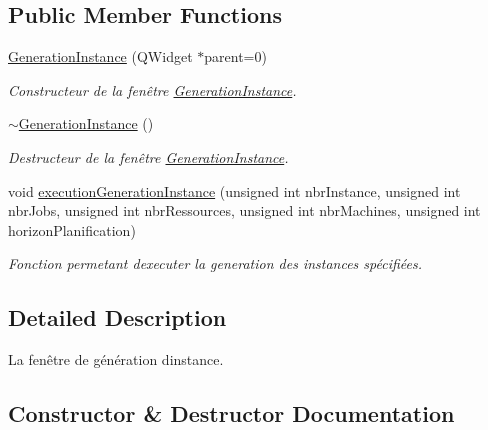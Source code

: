 \subsection*{Public Member Functions}
\begin{DoxyCompactItemize}
\item 
\hyperlink{classGenerationInstance_ac9c4a1ba1fe2f86209f116693f7c7b5b}{Generation\+Instance} (Q\+Widget $\ast$parent=0)
\begin{DoxyCompactList}\small\item\em Constructeur de la fenêtre \hyperlink{classGenerationInstance}{Generation\+Instance}. \end{DoxyCompactList}\item 
\hyperlink{classGenerationInstance_a14cdea0af4a47deb38a3a5fa59bb6d40}{$\sim$\+Generation\+Instance} ()
\begin{DoxyCompactList}\small\item\em Destructeur de la fenêtre \hyperlink{classGenerationInstance}{Generation\+Instance}. \end{DoxyCompactList}\item 
void \hyperlink{classGenerationInstance_a132cf0624c95e2891bf5662198ca42cf}{execution\+Generation\+Instance} (unsigned int nbr\+Instance, unsigned int nbr\+Jobs, unsigned int nbr\+Ressources, unsigned int nbr\+Machines, unsigned int horizon\+Planification)
\begin{DoxyCompactList}\small\item\em Fonction permetant d\textquotesingle{}executer la generation des instances spécifiées. \end{DoxyCompactList}\end{DoxyCompactItemize}


\subsection{Detailed Description}
La fenêtre de génération d\textquotesingle{}instance. 

\subsection{Constructor \& Destructor Documentation}
\mbox{\label{classGenerationInstance_ac9c4a1ba1fe2f86209f116693f7c7b5b}} 
